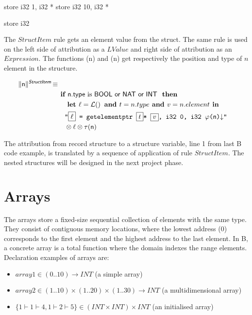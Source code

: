 \begin{llvmcode}
store i32 1, i32 * %
store i32 10, i32 * %

store i32 %
\end{llvmcode}

The $StructItem$ rule gets an element value from the struct. The same rule is used on the left side of attribution as a $LValue$ and right side of attribution as an $Expression$. The functions \SBPos(n) and \SBType(n)  get respectively the position and type of $n$ element in the structure. 

\begin{align*}
\begin{split}
  \trad{n}{\B{StructItem}} \isdef \\
   & \IF \B{n.type} \mbox{ is \B{BOOL or NAT or INT} } \THEN \\
   &\quad  \LET \ell = \lbl  \AND  \PH{t} = n.type \AND \PH{v} = n.element \IN\\
   &\quad  \llvm{"\PH{\ell} = getelementptr \PH{t}* \PH{v}, i32 0, i32  \SBPos(\B{n})\nl"} \\
   &\quad  \sep  \ell  \sep \SBType(\B{n})\\
\end{split}
\end{align*}

The attribution from record structure to a structure variable, line 1 from last 
B code example, is translated by a sequence of application of rule $StructItem$.
The nested structures will be designed in the next project phase.


\section{Arrays}

The arrays store a fixed-size sequential collection of elements with the same type. 
They consist of contiguous memory locations, where the lowest address (0) 
corresponds to the first element and the highest address to the last element.
In B, a concrete array is a total function where the domain indexes the range 
elements. Declaration examples of arrays are:
\begin{itemize}
	\item $array1 \in (0..10) \to INT $	(a simple array)
	\item $array2 \in (1..10) \times (1..20) \times (1..30) \to INT $   (a multidimensional array)
	\item $\{1\vdash1\vdash4, 1\vdash2\vdash5\}  \in (INT \times INT) \times INT$ (an initialised array)
\end{itemize} 



